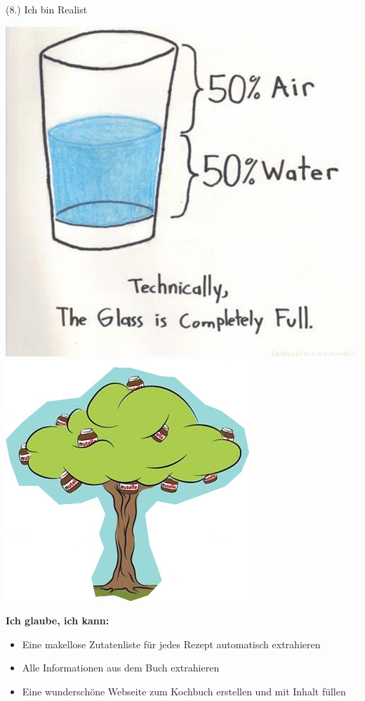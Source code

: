 \documentclass[12pt]{beamer}
\begin{document}
\begin{frame}{(8.) Ich bin Realist}
	\begin{minipage}{0.35\textwidth}
		\vspace*{0.7cm}\includegraphics[width=1\linewidth]{Images/Spoken-like-a-true-realist} \\
		
		\vspace*{0.2cm}\includegraphics[width=0.9\linewidth]{Images/Nutellabaum}
	\end{minipage}
	\begin{minipage}{0.6\textwidth}
		\textbf{Ich glaube, ich kann:}
		\begin{itemize}
			\item Eine makellose Zutatenliste für jedes Rezept automatisch extrahieren
			\item Alle Informationen aus dem Buch extrahieren
			\item Eine wunderschöne Webseite zum Kochbuch erstellen und mit Inhalt füllen


\end{itemize}
\end{minipage}
\end{frame}
\end{document}
